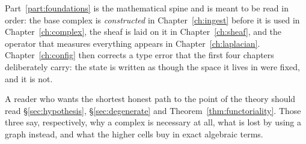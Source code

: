 Part~\ref{part:foundations} is the mathematical spine and is meant to be read
in order: the base complex is \emph{constructed} in
Chapter~\ref{ch:ingest} before it is used in Chapter~\ref{ch:complex}, the
sheaf is laid on it in Chapter~\ref{ch:sheaf}, and the operator that measures
everything appears in Chapter~\ref{ch:laplacian}. Chapter~\ref{ch:config}
then corrects a type error that the first four chapters deliberately carry:
the state is written as though the space it lives in were fixed, and it is
not.

A reader who wants the shortest honest path to the point of the theory should
read \S\ref{sec:hypothesis}, \S\ref{sec:degenerate} and
Theorem~\ref{thm:functoriality}. Those three say, respectively, why a complex
is necessary at all, what is lost by using a graph instead, and what the
higher cells buy in exact algebraic terms.
